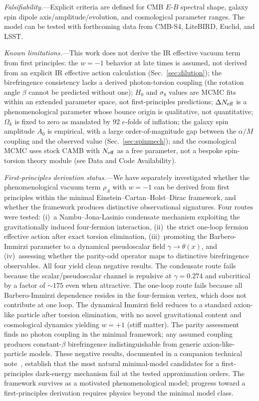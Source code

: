 \documentclass[aps,prd,twocolumn,superscriptaddress,showpacs,preprintnumbers,nofootinbib,longbibliography,floatfix]{revtex4-2}
\newcommand{\Neff}{N_{\rm eff}}
\begin{document}
\textit{Falsifiability.}---Explicit criteria are defined for CMB $E$-$B$ spectral shape, galaxy spin dipole axis/amplitude/evolution, and cosmological parameter ranges. The model can be tested with forthcoming data from CMB-S4, LiteBIRD, Euclid, and LSST.

\textit{Known limitations.}---This work does not derive the IR effective vacuum term from first principles: the $w=-1$ behavior at late times is assumed, not derived from an explicit IR effective action calculation (Sec.~\ref{sec:dilution}); the birefringence consistency lacks a derived photon-torsion coupling (the rotation angle $\beta$ cannot be predicted without one); $H_0$ and $\sigma_8$ values are MCMC fits within an extended parameter space, not first-principles predictions; $\Delta\Neff$ is a phenomenological parameter whose bounce origin is qualitative, not quantitative; $\Omega_k$ is fixed to zero as mandated by 92 $e$-folds of inflation; the galaxy spin amplitude $A_0$ is empirical, with a large order-of-magnitude gap between the $\alpha/M$ coupling and the observed value (Sec.~\ref{sec:spinmech}); and the cosmological MCMC uses stock CAMB with $\Neff$ as a free parameter, not a bespoke spin-torsion theory module (see Data and Code Availability).

\textit{First-principles derivation status.}---We have separately investigated whether the phenomenological vacuum term $\rho_\Lambda$ with $w=-1$ can be derived from first principles within the minimal Einstein--Cartan--Holst--Dirac framework, and whether the framework produces distinctive observational signatures. Four routes were tested: (i)~a Nambu--Jona-Lasinio condensate mechanism exploiting the gravitationally induced four-fermion interaction, (ii)~the strict one-loop fermion effective action after exact torsion elimination, (iii)~promoting the Barbero-Immirzi parameter to a dynamical pseudoscalar field $\gamma\to\theta(x)$, and (iv)~assessing whether the parity-odd operator maps to distinctive birefringence observables. All four yield clean negative results. The condensate route fails because the scalar/pseudoscalar channel is repulsive at $\gamma=0.274$ and subcritical by a factor of ${\sim}175$ even when attractive. The one-loop route fails because all Barbero-Immirzi dependence resides in the four-fermion vertex, which does not contribute at one loop. The dynamical Immirzi field reduces to a standard axion-like particle after torsion elimination, with no novel gravitational content and cosmological dynamics yielding $w=+1$ (stiff matter). The parity assessment finds no photon coupling in the minimal framework; any assumed coupling produces constant-$\beta$ birefringence indistinguishable from generic axion-like-particle models. These negative results, documented in a companion technical note~\cite{Golden2026supplement}, establish that the most natural minimal-model candidates for a first-principles dark-energy mechanism fail at the tested approximation orders. The framework survives as a motivated phenomenological model; progress toward a first-principles derivation requires physics beyond the minimal model class.
\end{document}
